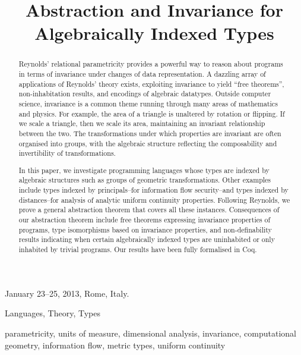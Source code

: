 \documentclass{sigplanconf}
\title{Abstraction and Invariance for Algebraically Indexed Types}
\theoremstyle{examplestyle}
\theoremstyle{restatementstyle}
\begin{document}
 {January 23--25, 2013, Rome, Italy.}

\maketitle

\begin{abstract}
  Reynolds' relational parametricity provides a powerful way to reason
  about programs in terms of invariance under changes of data
  representation. A dazzling array of applications of Reynolds' theory
  exists, exploiting invariance to yield ``free theorems'',
  non-inhabitation results, and encodings of algebraic datatypes.
  Outside computer science, invariance is a common theme running
  through many areas of mathematics and physics. For example, the area of
  a triangle is unaltered by rotation or flipping. If we scale a
  triangle, then we scale its area, maintaining an invariant
  relationship between the two. The transformations under which
  properties are invariant are often organised into groups, with the
  algebraic structure reflecting the composability and invertibility
  of transformations.

  In this paper, we investigate programming languages whose types are
  indexed by algebraic structures such as groups of geometric
  transformations. Other examples include types indexed by
  principals--for information flow security--and types indexed by
  distances--for analysis of analytic uniform continuity
  properties. Following Reynolds, we prove a general abstraction
  theorem that covers all these instances. Consequences of our
  abstraction theorem include free theorems expressing invariance
  properties of programs, type isomorphisms based on invariance
  properties, and non-definability results indicating when certain
  algebraically indexed types are uninhabited or only inhabited by
  trivial programs.  Our results have been fully formalised in Coq.
\end{abstract}

  

\terms
  Languages, Theory, Types

\keywords parametricity, units of measure, dimensional analysis,
invariance, computational geometry, information flow, metric types, uniform continuity
\end{document}
